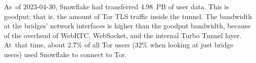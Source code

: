 \documentclass[letterpaper,twocolumn]{article}
\begin{document}
As~of \mbox{2023-04-30},
Snowflake had transferred 4.98~PB of user data.
This is goodput; that is, the amount of Tor TLS traffic inside the tunnel.
The bandwidth at the bridges' network interfaces is
higher than the goodput bandwidth,
because of the overhead of WebRTC, WebSocket, and
the internal Turbo Tunnel layer.
At~that time, about 2.7\% of all Tor users
(32\% when looking at just bridge users) used Snowflake to connect to Tor.
\end{document}
